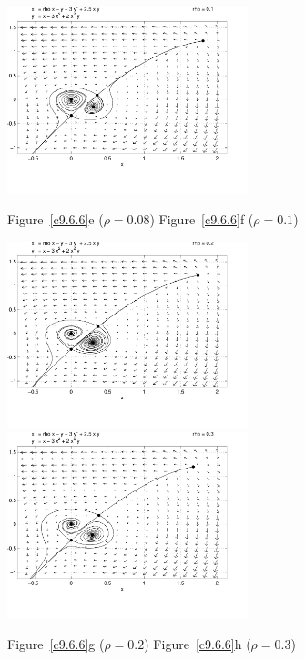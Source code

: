 \documentclass{ximera}
\begin{document}
\begin{computerExercise}
\begin{solution}
\begin{figure}[htb]
{     \includegraphics[width=2.75in]{exfigure/pr3-1.pdf}}
     \centerline{Figure~\ref{c9.6.6}e ($\rho = 0.08$)\hspace{1.3in} Figure~\ref{c9.6.6}f ($\rho = 0.1$)}
\end{figure}
\begin{figure}[htb]
     \centerline{%
     \includegraphics[width=2.75in]{exfigure/pr3-2.pdf}     
     \includegraphics[width=2.75in]{exfigure/pr3-3.pdf}}
     \centerline{Figure~\ref{c9.6.6}g ($\rho = 0.2$)\hspace{1.3in} Figure~\ref{c9.6.6}h ($\rho = 0.3$)}
\end{figure}

\clearpage

\end{solution}
\end{computerExercise}
\end{document}
